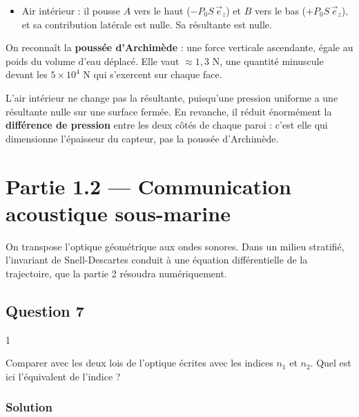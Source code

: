 \documentclass[11pt,a4paper]{article}
\providecommand{\tightlist}{\setlength{\itemsep}{0pt}\setlength{\parskip}{0pt}}
\newcommand{\equationajustee}[1]{%
  \sbox{\boiteequation}{$\displaystyle #1$}%
  \ifdim\wd\boiteequation>\linewidth
    \[\resizebox{\linewidth}{!}{\usebox{\boiteequation}}\]%
  \else
    \[#1\]%
  \fi}
\begin{document}
\begin{itemize}
\tightlist
\item
  Air intérieur : il pousse \(A\) vers le haut (\(-P_0 S\,\vec e_z\)) et \(B\) vers le bas (\(+P_0 S\,\vec e_z\)), et sa contribution latérale est nulle. Sa résultante est nulle.
\end{itemize}

\equationajustee{\boxed{\vec F = -\mu\,(\pi R^2 L)\,g\,\vec e_z}}

On reconnaît la \textbf{poussée d'Archimède} : une force verticale ascendante, égale au poids du volume d'eau déplacé. Elle vaut \(\approx 1{,}3\) N, une quantité minuscule devant les \(5 \times 10^4\) N qui s'exercent sur chaque face.

\begin{piege}

L'air intérieur ne change pas la résultante, puisqu'une pression uniforme a une résultante nulle sur une surface fermée. En revanche, il réduit énormément la \textbf{différence de pression} entre les deux côtés de chaque paroi : c'est elle qui dimensionne l'épaisseur du capteur, pas la poussée d'Archimède.

\end{piege}

\hypertarget{partie-1.2-communication-acoustique-sous-marine}{%
\section{Partie 1.2 --- Communication acoustique sous-marine}\label{partie-1.2-communication-acoustique-sous-marine}}

On transpose l'optique géométrique aux ondes sonores. Dans un milieu stratifié, l'invariant de Snell-Descartes conduit à une équation différentielle de la trajectoire, que la partie 2 résoudra numériquement.

\hypertarget{question-7}{%
\subsection{Question 7}\label{question-7}}

\begin{indication}{1}

Comparer avec les deux lois de l'optique écrites avec les indices \(n_1\) et \(n_2\). Quel est ici l'équivalent de l'indice ?

\end{indication}

\hypertarget{solution-6}{%
\subsubsection{Solution}\label{solution-6}}
\end{document}
